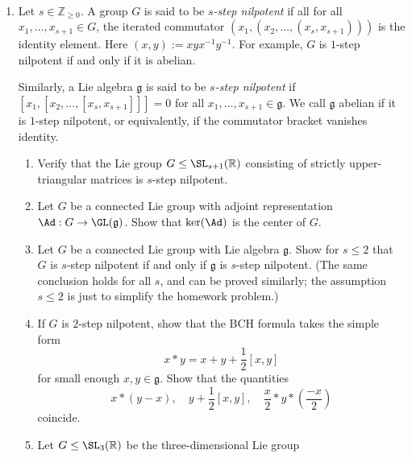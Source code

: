 \documentclass[reqno]{amsart} 
\begin{document}
\begin{homework}~\label{hw:bch-consequences}
  \begin{enumerate}
  \item
    Let $s \in \mathbb{Z}_{\geq 0}$.
    A group $G$ is said to be \emph{$s$-step nilpotent}
    if all
    for all $x_1,\dotsc,x_{s+1} \in G$,
    the iterated commutator
    $(x_1,(x_2,\dotsc,(x_{s},x_{s+1})))$
    is the identity element.
    Here $(x,y) := x y x^{-1} y^{-1}$.
    For example, $G$ is $1$-step nilpotent
    if and only if it is abelian.

    Similarly, a Lie algebra $\mathfrak{g}$ is said
    to be \emph{$s$-step nilpotent}
    if
    $[x_1,[x_2,\dotsc,[x_{s},x_{s+1}]]] = 0$
    for all
    $x_1,\dotsc,x_{s+1} \in \mathfrak{g}$.
    We call $\mathfrak{g}$ abelian if it is
    $1$-step nilpotent, or equivalently, if the commutator
    bracket vanishes identity.
    \begin{enumerate}
    \item
      Verify that the Lie group
      $G \leq \SL_{s+1}(\mathbb{R})$ consisting of strictly
      upper-triangular
      matrices
      is $s$-step nilpotent.
    \item
      Let $G$ be a connected Lie group
      with adjoint representation
      $\Ad : G \rightarrow \GL(\mathfrak{g})$.
      Show that $\ker(\Ad)$ is the center of $G$.
    \item Let $G$ be a connected Lie group with Lie algebra
      $\mathfrak{g}$.  Show for $s \leq 2$ that $G$ is $s$-step
      nilpotent if and only if $\mathfrak{g}$ is $s$-step
      nilpotent.  (The same conclusion holds for all $s$, and
      can be proved similarly; the assumption $s \leq 2$ is just
      to simplify the homework problem.)
    \item
      If $G$ is $2$-step nilpotent,
      show that the BCH formula
      takes the simple form
      \begin{equation}\label{eq:bchd-2-step}
        x \ast y = x + y + \frac{1}{2} [x,y]
      \end{equation} 
      for small enough $x,y \in \mathfrak{g}$.
      Show that the quantities
      \begin{equation}\label{eq:lie-algebra-elements-that-are-similar}
        x \ast (y-x),
        \quad
        y + \frac{1}{2} [x,y],
        \quad
        \frac{x}{2} \ast y
        \ast (\frac{-x}{2})
      \end{equation}
      coincide.
    \item Let $G \leq \SL_3(\mathbb{R})$ be the three-dimensional Lie group

\end{enumerate}
\end{enumerate}
\end{homework}
\end{document}
